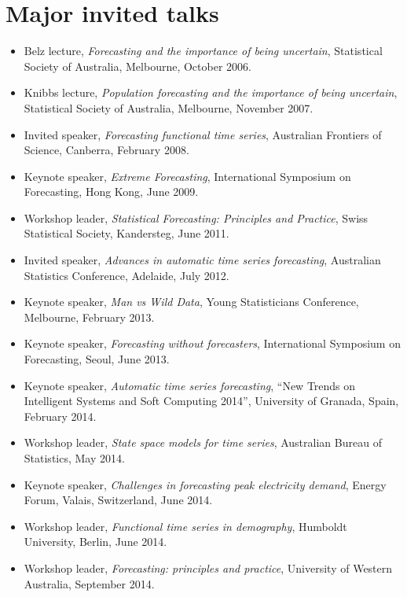 \documentclass[10pt,a4paper,]{article}
\providecommand{\tightlist}{%
  \setlength{\itemsep}{0pt}\setlength{\parskip}{0pt}}
\begin{document}
\newpage

\hypertarget{major-invited-talks}{%
\section{Major invited talks}\label{major-invited-talks}}

\begin{itemize}
\tightlist
\item
  Belz lecture, \emph{Forecasting and the importance of being
  uncertain}, Statistical Society of Australia, Melbourne, October 2006.
\item
  Knibbs lecture, \emph{Population forecasting and the importance of
  being uncertain}, Statistical Society of Australia, Melbourne,
  November 2007.
\item
  Invited speaker, \emph{Forecasting functional time series}, Australian
  Frontiers of Science, Canberra, February 2008.
\item
  Keynote speaker, \emph{Extreme Forecasting}, International Symposium
  on Forecasting, Hong Kong, June 2009.
\item
  Workshop leader, \emph{Statistical Forecasting: Principles and
  Practice}, Swiss Statistical Society, Kandersteg, June 2011.
\item
  Invited speaker, \emph{Advances in automatic time series forecasting},
  Australian Statistics Conference, Adelaide, July 2012.
\item
  Keynote speaker, \emph{Man vs Wild Data}, Young Statisticians
  Conference, Melbourne, February 2013.
\item
  Keynote speaker, \emph{Forecasting without forecasters}, International
  Symposium on Forecasting, Seoul, June 2013.
\item
  Keynote speaker, \emph{Automatic time series forecasting},
  \enquote{New Trends on Intelligent Systems and Soft Computing 2014},
  University of Granada, Spain, February 2014.
\item
  Workshop leader, \emph{State space models for time series}, Australian
  Bureau of Statistics, May 2014.
\item
  Keynote speaker, \emph{Challenges in forecasting peak electricity
  demand}, Energy Forum, Valais, Switzerland, June 2014.
\item
  Workshop leader, \emph{Functional time series in demography}, Humboldt
  University, Berlin, June 2014.
\item
  Workshop leader, \emph{Forecasting: principles and practice},
  University of Western Australia, September 2014.

\end{itemize}
\end{document}
